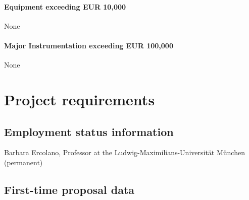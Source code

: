 \documentclass[10pt,fleqn,twoside]{article}
\begin{document}
\paragraph{Equipment exceeding EUR 10,000} 

None

\paragraph{Major Instrumentation exceeding EUR 100,000} 

None 

% 
% 
% 
% 
% 
% 
% 

\section{Project requirements}
\renewcommand{\leftmark}{\sc Project requirements}

\subsection{Employment status information}

Barbara Ercolano, Professor at the Ludwig-Maximilians-Universit\"at
M\"unchen  (permanent)

\subsection{First-time proposal data}
\end{document}
